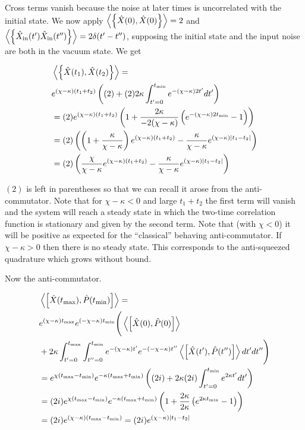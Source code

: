 \documentclass[12pt]{article}
\begin{document}
Cross terms vanish because the noise at later times is uncorrelated with the initial state. We now apply $\Braket{\left\{\hat{X}(0),\hat{X}(0)\right\}} = 2$ and $\Braket{\left\{\hat{X}_{\text{in}}(t')\hat{X}_{\text{in}}(t'')\right\}} = 2\delta(t' - t'')$, supposing the initial state and the input noise are both in the vacuum state. We get

\begin{align}
&\Braket{\left\{\hat{X}(t_1),\hat{X}(t_2) \right\}} = \\
&e^{(\chi - \kappa)(t_1 + t_2)}\left((2) + (2)2\kappa\int_{t'=0}^{t_{\text{min}}} e^{-(\chi-\kappa)2t'} dt' \right)\\
&=(2)e^{(\chi - \kappa)(t_1 + t_2)}\left(1 + \frac{2\kappa}{-2(\chi-\kappa)} \left(e^{-(\chi-\kappa)2t_{\text{min}}} - 1\right) \right)\\
&=(2)\left(\left(1 + \frac{\kappa}{\chi-\kappa} \right)e^{(\chi-\kappa)(t_1+t_2)} - \frac{\kappa}{\chi-\kappa} e^{(\chi-\kappa)|t_1-t_2|} \right)\\
&= (2)\left(\frac{\chi}{\chi-\kappa}e^{(\chi-\kappa)(t_1+t_2)} - \frac{\kappa}{\chi-\kappa} e^{(\chi-\kappa)|t_1-t_2|} \right)
\end{align}

$(2)$ is left in parentheses so that we can recall it arose from the anti-commutator. Note that for $\chi-\kappa <0$ and large $t_1+t_2$ the first term will vanish and the system will reach a steady state in which the two-time correlation function is stationary and given by the second term. Note that (with $\chi<0$) it will be positive as expected for the ``classical'' behaving anti-commutator. If $\chi-\kappa > 0$ then there is no steady state. This corresponds to the anti-squeezed quadrature which grows without bound.

Now the anti-commutator.

\begin{align}
&\Braket{\left[\hat{X}(t_{\text{max}}),\hat{P}(t_{\text{min}}) \right]} = \\
&e^{(\chi-\kappa)t_{\text{max}}} e^{(-\chi-\kappa)t_{\text{min}}}\Bigg(\Braket{\left[\hat{X}(0),\hat{P}(0) \right]}\\
& + 2\kappa \int_{t'=0}^{t_{\text{max}}} \int_{t''=0}^{t_{\text{min}}} e^{-(\chi-\kappa)t'}e^{-(-\chi-\kappa)t''}\Braket{\left[\hat{X}(t'),\hat{P}(t'') \right]}dt'dt''\Bigg)\\
&= e^{\chi(t_{\text{max}} - t_{\text{min}})} e^{-\kappa(t_{\text{max}}+t_{\text{min}})} \left((2i) + 2\kappa (2i) \int_{t'=0}^{t_{\text{min}}} e^{2\kappa t'} dt' \right)\\
&= (2i) e^{\chi(t_{\text{max}} - t_{\text{min}})} e^{-\kappa(t_{\text{max}}+t_{\text{min}})} \left(1 + \frac{2\kappa}{2\kappa}\left(e^{2\kappa t_{\text{min}}} - 1 \right) \right)\\
&= (2i)e^{(\chi-\kappa)(t_{\text{max}}-t_{\text{min}})} = (2i) e^{(\chi-\kappa)|t_1-t_2|}
\end{align}
\end{document}

